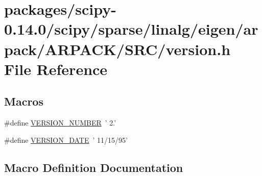 \hypertarget{scipy-0_814_80_2scipy_2sparse_2linalg_2eigen_2arpack_2ARPACK_2SRC_2version_8h}{}\section{packages/scipy-\/0.14.0/scipy/sparse/linalg/eigen/arpack/\+A\+R\+P\+A\+C\+K/\+S\+R\+C/version.h File Reference}
\label{scipy-0_814_80_2scipy_2sparse_2linalg_2eigen_2arpack_2ARPACK_2SRC_2version_8h}
\subsection*{Macros}
\begin{DoxyCompactItemize}
\item 
\#define \hyperlink{scipy-0_814_80_2scipy_2sparse_2linalg_2eigen_2arpack_2ARPACK_2SRC_2version_8h_affb1ffbd24de6be88bd8ac877aae1688}{V\+E\+R\+S\+I\+O\+N\+\_\+\+N\+U\+M\+B\+E\+R}~' 2.'
\item 
\#define \hyperlink{scipy-0_814_80_2scipy_2sparse_2linalg_2eigen_2arpack_2ARPACK_2SRC_2version_8h_a2ee35570b8aaef9829b3b69a049ab039}{V\+E\+R\+S\+I\+O\+N\+\_\+\+D\+A\+T\+E}~' 11/15/95'
\end{DoxyCompactItemize}


\subsection{Macro Definition Documentation}
\hypertarget{scipy-0_814_80_2scipy_2sparse_2linalg_2eigen_2arpack_2ARPACK_2SRC_2version_8h_a2ee35570b8aaef9829b3b69a049ab039}{}
